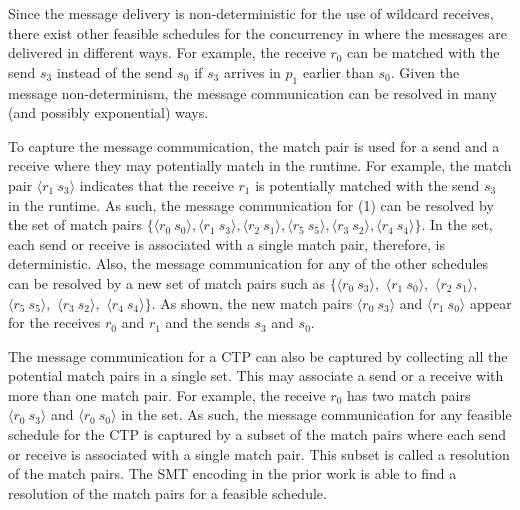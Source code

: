 Since the message delivery is non-deterministic for the use of wildcard receives, there exist other feasible schedules for the concurrency in  where the messages are delivered in different ways. For example,  the receive $r_0$ can be matched with the send $s_3$ instead of the send $s_0$ if $s_3$ arrives in $p_1$ earlier than $s_0$. Given the message non-determinism, the message communication can be resolved in many (and possibly exponential) ways. 

To capture the message communication, the match pair is used for a send and a receive where they may potentially match in the runtime.
For example, the match pair $\langle r_1\ s_3\rangle$ indicates that the receive $r_1$ is potentially matched with the send $s_3$ in the runtime.
As such, the message communication for (1) can be resolved by the set of match pairs $\{\langle r_0\ s_0\rangle, \langle r_1\ s_3\rangle, \langle r_2\ s_1\rangle, \langle r_5\ s_5\rangle, \langle r_3\ s_2\rangle, \langle r_4\ s_4\rangle\}$. In the set, each send or receive is associated with a single match pair, therefore, is deterministic. Also, the message communication for any of the other schedules can be resolved by a new set of match pairs such as $\{\langle r_0\ s_3\rangle,$ $\langle r_1\ s_0\rangle,$ $\langle r_2\ s_1\rangle,$ $\langle r_5\ s_5\rangle,$ $\langle r_3\ s_2\rangle,$ $\langle r_4\ s_4\rangle\}$. As shown, the new match pairs $\langle r_0\ s_3\rangle$ and $\langle r_1\ s_0\rangle$ appear for the receives $r_0$ and $r_1$ and the sends $s_3$ and $s_0$. 

The message communication for a CTP can also be captured by collecting all the potential match pairs in a single set. This may associate a send or a receive with more than one match pair. For example, the receive $r_0$ has two match pairs $\langle r_0\ s_3\rangle$ and $\langle r_0\ s_0\rangle$ in the set. As such, the message communication for any feasible schedule for the CTP is captured by a subset of the match pairs where each send or receive is associated with a single match pair. This subset is called a resolution of the match pairs.
The SMT encoding in the prior work is able to find a resolution of the match pairs for a feasible schedule.







